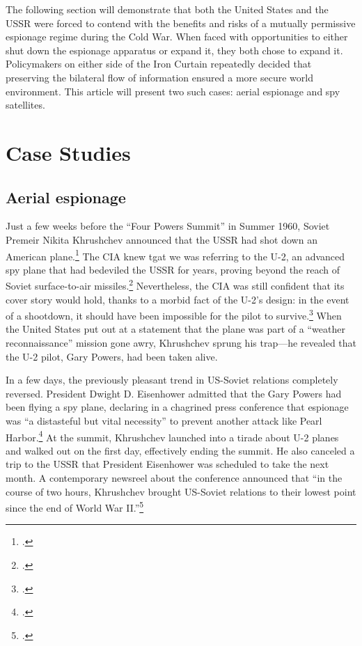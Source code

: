 \documentclass[12pt]{extarticle}
\begin{document}
The following section will demonstrate that both the United States and the USSR were forced to contend with the benefits and risks of a mutually permissive espionage regime during the Cold War. When faced with opportunities to either shut down the espionage apparatus or expand it, they both chose to expand it. Policymakers on either side of the Iron Curtain repeatedly decided that preserving the bilateral flow of information ensured a more secure world environment. This article will present two such cases: aerial espionage and spy satellites.

\section{Case Studies}

\subsection{Aerial espionage}
Just a few weeks before the \enquote{Four Powers Summit} in Summer 1960, Soviet Premeir Nikita Khrushchev announced that the USSR had shot down an American plane.\footcite[112]{powers_operation_2004} The CIA knew tgat we was referring to the U-2, an advanced spy plane that had bedeviled the USSR for years, proving beyond the reach of Soviet surface-to-air missiles.\footcite{orlov_u-2_2007} Nevertheless, the CIA was still confident that its cover story would hold, thanks to a morbid fact of the U-2's design: in the event of a shootdown, it should have been impossible for the pilot to survive.\footcite[35]{lindgren_trust_2000} When the United States put out at a statement that the plane was part of a \enquote{weather reconnaissance} mission gone awry, Khrushchev sprung his trap---he revealed that the U-2 pilot, Gary Powers, had been taken alive.

In a few days, the previously pleasant trend in US-Soviet relations completely reversed. President Dwight D. Eisenhower admitted that the Gary Powers had been flying a spy plane, declaring in a chagrined press conference that espionage was ``a distasteful but vital necessity'' to prevent another attack like Pearl Harbor.\footcite{eisenhower_news_1960} At the summit, Khrushchev launched into a tirade about U-2 planes and walked out on the first day, effectively ending the summit. He also canceled a trip to the USSR that President Eisenhower was scheduled to take the next month. A contemporary newsreel about the conference announced that \enquote{in the course of two hours, Khrushchev brought US-Soviet relations to their lowest point since the end of World War II.}\footcite{universal_studios_summit_1960}
\end{document}
